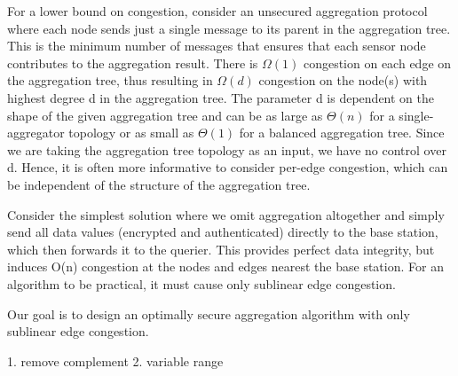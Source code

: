 For a lower bound on congestion, consider an unsecured aggregation
protocol where each node sends just a single message to
its parent in the aggregation tree. This is the minimum number
of messages that ensures that each sensor node contributes to the
aggregation result. There is $\Omega(1)$ congestion on each edge on the
aggregation tree, thus resulting in $\Omega(d)$ congestion on the node(s)
with highest degree d in the aggregation tree. The parameter d is
dependent on the shape of the given aggregation tree and can be as
large as $\Theta(n)$ for a single-aggregator topology or as small as $\Theta(1)$ for a balanced aggregation tree. Since we are taking the aggregation
tree topology as an input, we have no control over d. Hence,
it is often more informative to consider per-edge congestion, which
can be independent of the structure of the aggregation tree.

Consider the simplest solution where we omit aggregation altogether
and simply send all data values (encrypted and authenticated)
directly to the base station, which then forwards it to the
querier. This provides perfect data integrity, but induces O(n) congestion
at the nodes and edges nearest the base station. For an algorithm
to be practical, it must cause only sublinear edge congestion.

Our goal is to design an optimally secure aggregation algorithm
with only sublinear edge congestion.


	1. remove complement
	2. variable range